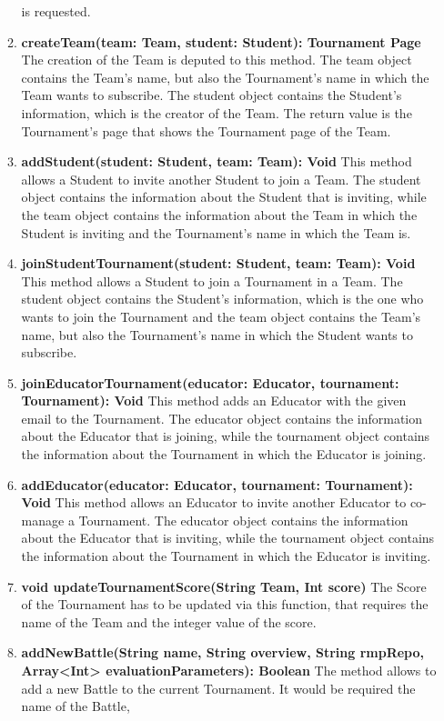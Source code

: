 \begin{enumerate}
\begin{enumerate}[label=$\bullet$]
            is requested.
            \item \textbf{createTeam(team: Team, student: Student): Tournament Page} The creation of the Team is deputed to this method. The team object contains the Team's name, but also the Tournament's name in which the Team wants to subscribe. 
            The student object contains the Student's information, which is the creator of the Team. The return value is the Tournament's page that shows the Tournament page of the Team.
            \item \textbf{addStudent(student: Student, team: Team): Void} This method allows a Student to invite another Student to join a Team. The student object contains the information about the Student that is inviting, while the team
            object contains the information about the Team in which the Student is inviting and the Tournament's name in which the Team is.
            \item \textbf{joinStudentTournament(student: Student, team: Team): Void} This method allows a Student to join a Tournament in a Team. The student object contains the Student's information, which is the one who wants to join 
            the Tournament and the team object contains the Team's name, but also the Tournament's name in which the Student wants to subscribe.
            \item \textbf{joinEducatorTournament(educator: Educator, tournament: Tournament): Void} This method adds an Educator with the given email to the Tournament. The educator object contains the information about the Educator
            that is joining, while the tournament object contains the information about the Tournament in which the Educator is joining.
            \item \textbf{addEducator(educator: Educator, tournament: Tournament): Void} This method allows an Educator to invite another Educator to co-manage a Tournament. The educator object contains the information about the Educator
            that is inviting, while the tournament object contains the information about the Tournament in which the Educator is inviting.
            \item \textbf{void updateTournamentScore(String Team, Int score)} The Score of the Tournament has to be updated via this function, that requires the name of the Team and the integer value of the score.
            \item \textbf{addNewBattle(String name, String overview, String rmpRepo, Array<Int> evaluationParameters): Boolean} The method allows to add a new Battle to the current Tournament. It would be required the name of the Battle, 

\end{enumerate}
\end{enumerate}
